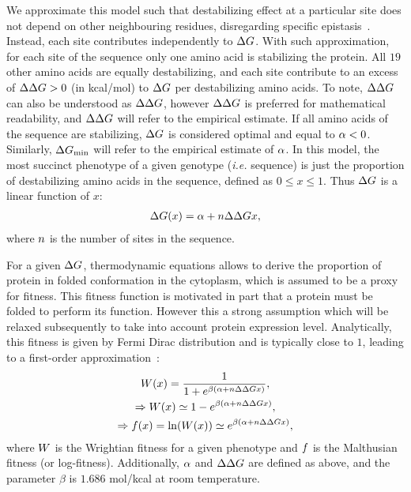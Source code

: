 We approximate this model such that destabilizing effect at a particular site does not depend on other neighbouring residues, disregarding specific epistasis~\citep{Dasmeh2014}.
Instead, each site contributes independently to $\Delta G$.
With such approximation, for each site of the sequence only one amino acid is stabilizing the protein.
All $19$ other amino acids are equally destabilizing, and each site contribute to an excess of $\Delta \Delta G > 0$ (in kcal/mol) to $\Delta G$ per destabilizing amino acids.
To note, $\Delta \Delta G$ can also be understood as $\Delta \Delta G$, however $\Delta \Delta G$ is preferred for mathematical readability, and $\Delta \Delta G$ will refer to the empirical estimate.
If all amino acids of the sequence are stabilizing, $\Delta G$ is considered optimal and equal to $ \alpha < 0$.
Similarly, $\Delta G_{\text{min}}$ will refer to the empirical estimate of $\alpha$.
In this model, the most succinct phenotype of a given genotype (\textit{i.e.} sequence) is just the proportion of destabilizing amino acids in the sequence, defined as $0 \leq x \leq 1$.
Thus $\Delta G$ is a linear function of $x$:
\begin{align}
    \Delta G (x) = \alpha + n \Delta \Delta G x,
\end{align}
where $n$ is the number of sites in the sequence.

For a given $\Delta G$, thermodynamic equations allows to derive the proportion of protein in folded conformation in the cytoplasm, which is assumed to be a proxy for fitness.
This fitness function is motivated in part that a protein must be folded to perform its function.
However this a strong assumption which will be relaxed subsequently to take into account protein expression level.
Analytically, this fitness is given by Fermi Dirac distribution and is typically close to $1$, leading to a first-order approximation~\citep{Goldstein2011}:
\begin{gather}
    W (x) = \dfrac{1}{1 + e^{\beta (\alpha + n \Delta \Delta G x)}},\\
    \Rightarrow W (x) \simeq 1 - e^{\beta (\alpha + n \Delta \Delta G x)},\\
    \Rightarrow f (x) = \ln ( W (x) ) \simeq e^{\beta (\alpha + n \Delta \Delta G x)},
\end{gather}
where $W$ is the Wrightian fitness for a given phenotype and $f $ is the Malthusian fitness (or log-fitness).
Additionally, $\alpha$ and $\Delta \Delta G$ are defined as above, and the parameter $\beta$ is $1.686$ mol/kcal at room temperature.

